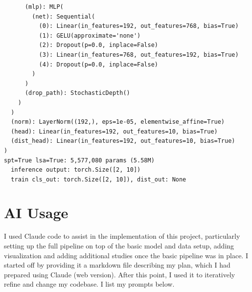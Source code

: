 \documentclass[11pt]{article}
\begin{document}
\begin{verbatim}
      (mlp): MLP(
        (net): Sequential(
          (0): Linear(in_features=192, out_features=768, bias=True)
          (1): GELU(approximate='none')
          (2): Dropout(p=0.0, inplace=False)
          (3): Linear(in_features=768, out_features=192, bias=True)
          (4): Dropout(p=0.0, inplace=False)
        )
      )
      (drop_path): StochasticDepth()
    )
  )
  (norm): LayerNorm((192,), eps=1e-05, elementwise_affine=True)
  (head): Linear(in_features=192, out_features=10, bias=True)
  (dist_head): Linear(in_features=192, out_features=10, bias=True)
)
spt=True lsa=True: 5,577,080 params (5.58M)
  inference output: torch.Size([2, 10])
  train cls_out: torch.Size([2, 10]), dist_out: None
\end{verbatim}


\section{AI Usage}\label{sec:ai-use}

I used Claude code to assist in the implementation of this project, particularly setting up the full pipeline on top of the basic model and data setup, adding visualization and adding additional studies once the basic pipeline was in place. I started off by providing it a markdown file describing my plan, which I had prepared using Claude (web version). After this point, I used it to iteratively refine and change my codebase. I list my prompts below.
\end{document}
